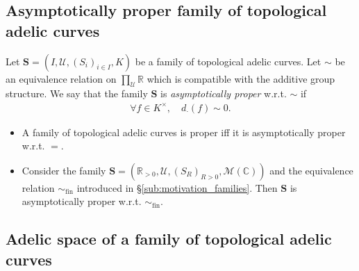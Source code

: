\documentclass [11pt,reqno]{amsart}
\def\bC{{\mathbb{C}}}
\def\bR{{\mathbb{R}}}
\newcommand{\1}{\mathmybb{1}}
\def\cM{{\mathcal{M}}}
\def\cU{{\mathcal{U}}}
\def\fin{\mathrm{fin}}
\begin{document}
\subsection{Asymptotically proper family of topological adelic curves}

\begin{definition}
\label{def:family_of_tac_proper}
Let $\mathbf{S}=(I,\cU,(S_{i})_{i\in I},K)$ be a family of topological adelic curves. Let $\sim$ be an equivalence relation on $\prod_{\cU}\bR$ which is compatible with the additive group structure. We say that the family $\mathbf{S}$ is \emph{asymptotically proper} w.r.t. $\sim$ if 
\begin{align*}
\forall f\in K^{\times}, \quad d_{\cdot}(f) \sim 0.
\end{align*}
\end{definition}

\begin{example}
\label{example:family_of_tac_proper}
\begin{itemize}
	\item[(1)] A family of topological adelic curves is proper iff it is asymptotically proper w.r.t. $=$.
	\item[(2)] Consider the family $\mathbf{S}=(\bR_{>0},\cU,(S_{R})_{R>0},\cM(\bC))$ and the equivalence relation $\sim_{\fin}$ introduced in \S \ref{sub:motivation_families}. Then $\mathbf{S}$ is asymptotically proper w.r.t. $\sim_{\fin}$.
\end{itemize}
\end{example}

\subsection{Adelic space of a family of topological adelic curves}
\label{sub:adelic_space_family_tac}
\end{document}
